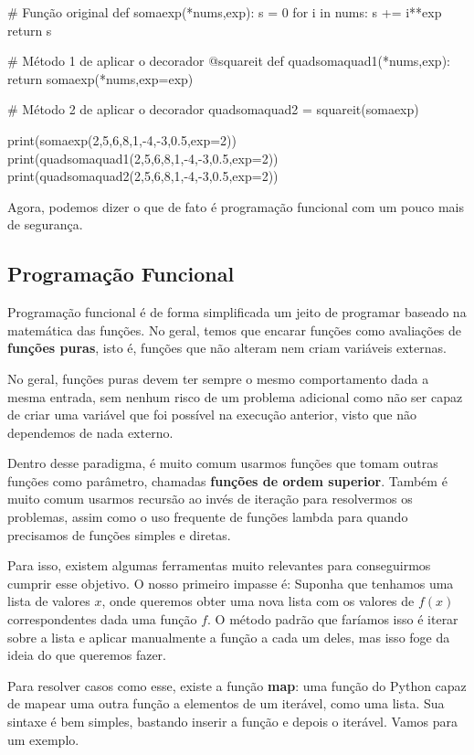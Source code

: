 \documentclass[11pt, a4paper]{article}
\begin{document}
\begin{code}
# Função original
def somaexp(*nums,exp):
    s = 0
    for i in nums:
        s += i**exp
    return s

# Método 1 de aplicar o decorador
@squareit
def quadsomaquad1(*nums,exp):
    return somaexp(*nums,exp=exp)

# Método 2 de aplicar o decorador
quadsomaquad2 = squareit(somaexp)

print(somaexp(2,5,6,8,1,-4,-3,0.5,exp=2))
print(quadsomaquad1(2,5,6,8,1,-4,-3,0.5,exp=2))
print(quadsomaquad2(2,5,6,8,1,-4,-3,0.5,exp=2))
\end{code}

Agora, podemos dizer o que de fato é programação funcional com um pouco mais de segurança.

\subsection{Programação Funcional}

Programação funcional é de forma simplificada um jeito de programar baseado na matemática das funções. No geral, temos que encarar funções como avaliações de \textbf{funções puras}, isto é, funções que não alteram nem criam variáveis externas.

No geral, funções puras devem ter sempre o mesmo comportamento dada a mesma entrada, sem nenhum risco de um problema adicional como não ser capaz de criar uma variável que foi possível na execução anterior, visto que não dependemos de nada externo.

Dentro desse paradigma, é muito comum usarmos funções que tomam outras funções como parâmetro, chamadas \textbf{funções de ordem superior}. Também é muito comum usarmos recursão ao invés de iteração para resolvermos os problemas, assim como o uso frequente de funções lambda para quando precisamos de funções simples e diretas.

Para isso, existem algumas ferramentas muito relevantes para conseguirmos cumprir esse objetivo. O nosso primeiro impasse é: Suponha que tenhamos uma lista de valores \(x\), onde queremos obter uma nova lista com os valores de \(f(x)\) correspondentes dada uma função \(f\). O método padrão que faríamos isso é iterar sobre a lista e aplicar manualmente a função a cada um deles, mas isso foge da ideia do que queremos fazer.

Para resolver casos como esse, existe a função \textbf{map}: uma função do Python capaz de mapear uma outra função a elementos de um iterável, como uma lista. Sua sintaxe é bem simples, bastando inserir a função e depois o iterável. Vamos para um exemplo.
\end{document}
